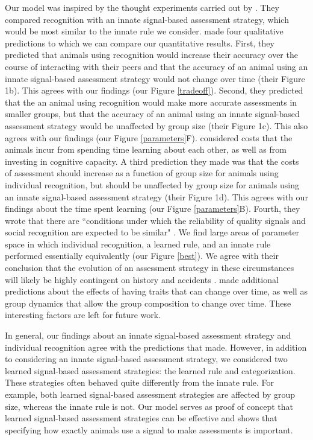Our model was inspired by the thought experiments carried out by \citet{sheehan2016evotradeoff}. They compared recognition with an innate signal-based assessment strategy, which would be most similar to the innate rule we consider. \citet{sheehan2016evotradeoff} made four qualitative predictions to which we can compare our quantitative results. First, they predicted that animals using recognition would increase their accuracy over the course of interacting with their peers and that the accuracy of an animal using an innate signal-based assessment strategy would not change over time (their Figure 1b). This agrees with our findings (our Figure \ref{tradeoff}).  Second, they predicted that the an animal using recognition would make more accurate assessments in smaller groups, but that the accuracy of an animal using an innate signal-based assessment strategy would be unaffected by group size (their Figure 1c). This also agrees with our findings (our Figure \ref{parameters}F). \citet{sheehan2016evotradeoff} considered costs that the animals incur from spending time learning about each other, as well as from investing in cognitive capacity. A third prediction they made was that the costs of assessment should increase as a function of group size for animals using individual recognition, but should be unaffected by group size for animals using an innate signal-based assessment strategy (their Figure 1d). This agrees with our findings about the time spent learning (our Figure \ref{parameters}B). Fourth, they wrote that there are ``conditions under which the reliability of quality signals and social recognition are expected to be similar" \citep{sheehan2016evotradeoff}. We find large areas of parameter space in which individual recognition, a learned rule, and an innate rule performed essentially equivalently (our Figure \ref{best}). We agree with their conclusion that the evolution of an assessment strategy in these circumstances will likely be highly contingent on history and accidents \citep{sheehan2016evotradeoff}. \citet{sheehan2016evotradeoff} made additional predictions about the effects of having traits that can change over time, as well as group dynamics that allow the group composition to change over time. These interesting factors are left for future work.

In general, our findings about an innate signal-based assessment strategy and individual recognition agree with the predictions that \citet{sheehan2016evotradeoff} made. However, in addition to considering an innate signal-based assessment strategy, we considered two learned signal-based assessment strategies: the learned rule and categorization. These strategies often behaved quite differently from the innate rule. For example, both learned signal-based assessment strategies are affected by group size, whereas the innate rule is not. Our model serves as proof of concept that learned signal-based assessment strategies can be effective and shows that specifying how exactly animals use a signal to make assessments is important.

